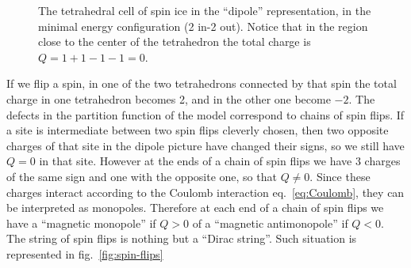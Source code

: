 \documentclass[../main/main.tex]{subfiles}
\begin{document}
\begin{figure}[h]

\caption{The tetrahedral cell of spin ice in the ``dipole'' representation, in the minimal energy configuration (2 in-2 out). Notice that in the region close to the center of the tetrahedron the total charge is $Q=1+1-1-1=0$.}
\label{fig:spin-ice-dipole}
\end{figure}

If we flip a spin, in one of the two tetrahedrons connected by that spin the total charge in one tetrahedron becomes 2, and in the other one become $-2$. The defects in the partition function of the model correspond to chains of spin flips. If a site is intermediate between two spin flips cleverly chosen, then two opposite charges of that site in the dipole picture have changed their signs, so we still have $Q=0$ in that site. However at the ends of a chain of spin flips we have 3 charges of the same sign and one with the opposite one, so that $Q\neq0$. Since these charges interact according to the Coulomb interaction eq.~\eqref{eq:Coulomb}, they can be interpreted as monopoles. Therefore at each end of a chain of spin flips we have a ``magnetic monopole'' if $Q>0$ of a ``magnetic antimonopole'' if $Q<0$. The string of spin flips is nothing but a ``Dirac string''. Such situation is represented in fig.~\ref{fig:spin-flips}
\end{document}

